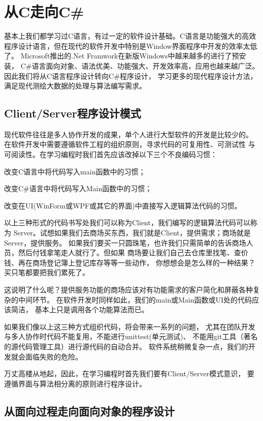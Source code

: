 
\chapter{从C走向C\#}

基本上我们都学习过C语言，有过一定的软件设计基础。C语言是功能强大的高效
程序设计语言，但在现代的软件开发中特别是Window界面程序中开发的效率太低了。
Microsoft推出的.Net Framwork在新版Windows中越来越多的进行了预安装，
C\#语言面向对象、语法优美、功能强大、开发效率高，应用也越来越广泛。
因此我们将从C语言程序设计转向C\#程序设计，
学习更多的现代程序设计方法，满足现代测绘大数据的处理与算法编写需求。

\section{Client/Server程序设计模式}
现代软件往往是多人协作开发的成果，单个人进行大型软件的开发是比较少的。
在软件开发中需要遵循软件工程的组织原则，寻求代码的可复用性、可测试性
与可阅读性。在学习编程时我们首先应该改掉以下三个不良编码习惯：

改变C语言中将代码写入main函数中的习惯；

改变C\#语言中将代码写入Main函数中的习惯；

改变在UI(WinForm或WPF或其它的界面)中直接写入逻辑算法代码的习惯。

以上三种形式的代码书写处我们可以称为Client，我们编写的逻辑算法代码可以称为
Server。试想如果我们去商场买东西，我们就是Client，提供需求；商场就是Server，提供服务。
如果我们要买一只圆珠笔，也许我们只需简单的告诉商场人员，然后付钱拿笔走人就行了。但如果
商场要让我们自己去仓库里找笔、查价钱、再在商场登记簿上登记库存等等一些动作，
你想想会是怎么样的一种结果？买只笔都要把我们累死了。

这说明了什么呢？提供服务功能的商场应该对有功能需求的客户简化和屏蔽各种复杂的中间环节。
在软件开发时同样如此，我们的main或Main函数或UI处的代码应该简洁，
基本上只是调用各个功能算法而已。

如果我们像以上这三种方式组织代码，将会带来一系列的问题，
尤其在团队开发与多人协作时代码不能复用，不能进行unittest(单元测试)、
不能用git工具（著名的源代码管理工具）进行源代码的自动合并。
软件系统稍微复杂一点，我们的开发就会面临失败的危险。

万丈高楼从地起，因此，在学习编程时首先我们要有Client/Server模式意识，
要遵循界面与算法相分离的原则进行程序设计。

\section{从面向过程走向面向对象的程序设计 }

